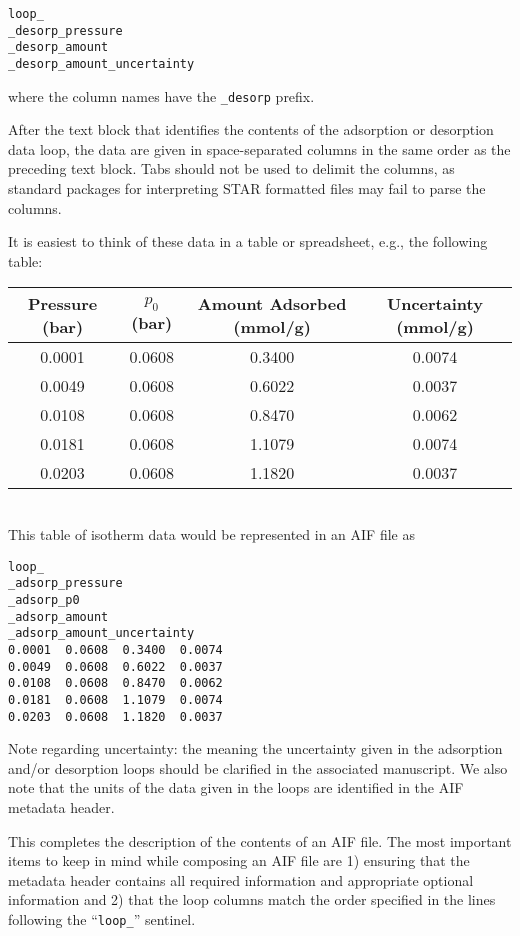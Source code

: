\documentclass[preprint,pre,showkeys,12pt,superscriptaddress,nofootinbib,endfloats*]{revtex4-1}
\begin{document}
\begin{verbatim}
loop_
_desorp_pressure
_desorp_amount
_desorp_amount_uncertainty
\end{verbatim}

\noindent where the column names have the \verb!_desorp! prefix.

After the text block that identifies the contents of the adsorption or desorption data loop, the data are given in space-separated columns in the same order as the preceding text block. Tabs should not be used to delimit the columns, as standard packages for interpreting STAR formatted files may fail to parse the columns.

It is easiest to think of these data in a table or spreadsheet, e.g., the following table:\\

\begin{tabular}{|c|c|c|c|}
  \hline
  \textbf{Pressure (bar)} & \textbf{$p_0$ (bar)} & \textbf{Amount Adsorbed (mmol/g)} & \textbf{Uncertainty (mmol/g)}\\
  \hline
  0.0001 & 0.0608 & 0.3400 & 0.0074\\ \hline
  0.0049 & 0.0608 & 0.6022 & 0.0037\\ \hline
  0.0108 & 0.0608 & 0.8470 & 0.0062\\ \hline
  0.0181 & 0.0608 & 1.1079 & 0.0074\\ \hline
  0.0203 & 0.0608 & 1.1820 & 0.0037\\ \hline
\end{tabular}\\

\noindent This table of isotherm data would be represented in an AIF file as

\begin{verbatim}
loop_
_adsorp_pressure
_adsorp_p0
_adsorp_amount
_adsorp_amount_uncertainty
0.0001  0.0608  0.3400  0.0074
0.0049  0.0608  0.6022  0.0037
0.0108  0.0608  0.8470  0.0062
0.0181  0.0608  1.1079  0.0074
0.0203  0.0608  1.1820  0.0037
\end{verbatim}

\noindent Note regarding uncertainty: the meaning the uncertainty given in the adsorption and/or desorption loops should be clarified in the associated manuscript. We also note that the units of the data given in the loops are identified in the AIF metadata header.

This completes the description of the contents of an AIF file. The most important items to keep in mind while composing an AIF file are 1) ensuring that the metadata header contains all required information and appropriate optional information and 2) that the loop columns match the order specified in the lines following the ``\verb!loop_!'' sentinel.
\end{document}
